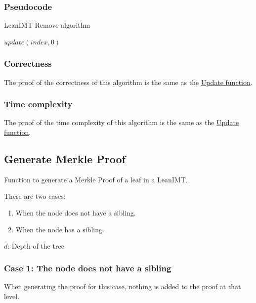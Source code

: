 \documentclass{article}
\begin{document}
\subsubsection{Pseudocode}

\begin{algorithm}[H]
    \caption{LeanIMT Remove algorithm}\label{remove}
    \begin{algorithmic}[1]
        \State $update(index, 0)$
        \EndProcedure
    \end{algorithmic}
\end{algorithm}



\subsubsection{Correctness}

The proof of the correctness of this algorithm is the same as the \hyperref[sec:update-correctness]{Update function}.

\subsubsection{Time complexity}

The proof of the time complexity of this algorithm is the same as the \hyperref[sec:update-time-complexity]{Update function}.

\subsection{Generate Merkle Proof}

Function to generate a Merkle Proof of a leaf in a LeanIMT.

There are two cases:

\begin{enumerate}
    \item When the node does not have a sibling.
    \item When the node has a sibling.
\end{enumerate}

$d$: Depth of the tree

\subsubsection*{Case 1: The node does not have a sibling}

When generating the proof for this case, nothing is added to the proof at that level.
\end{document}
